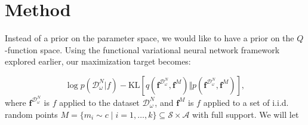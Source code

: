 \documentclass[]{uai2021} %
\newcommand{\E}{\mathbb{E}}
\newcommand{\N}{\mathbb{N}}
\newcommand{\D}{\mathcal{D}}
\newcommand{\X}{\mathbf{X}}
\newcommand{\f}{\mathbf{f}}
\newcommand{\state}{\mathcal{S}}
\newcommand{\action}{\mathcal{A}}
\newcommand{\KL}{\mathrm{KL}}
\begin{document}




\section{Method}
Instead of a prior on the parameter space, we would like to have a prior on the \(Q\)-function space.
Using the functional variational neural network framework explored earlier, our maximization target
becomes:

\begin{equation}
    \log p(\D_\omega^N \vert f) - \KL \left[ q(\f^{\D_\omega^N}, \f^M) \Vert p(\f^{\D_\omega^N}, \f^M) \right],
\end{equation}
where \(\f^{\D_\omega^N}\) is \(f\) applied to the dataset \(\D_\omega^N\), and \(\f^M\) is \(f\) applied to
a set of i.i.d. random points \(M = \{m_i \sim c \mid i=1,\dots,k\} \subseteq \state \times \action\)
with full support. We will let
\end{document}
